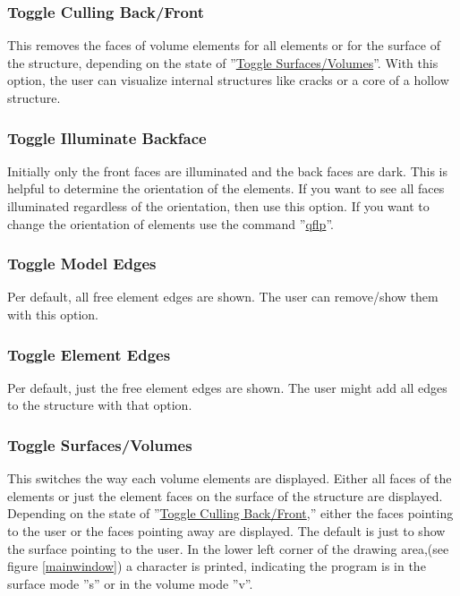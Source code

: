 \documentclass{article}
\providecommand{\htmlref}[2]{\hyperref[#2]{#1}}
\begin{document}
\subsubsection{\label{Toggle Culling Back/Front}Toggle Culling Back/Front}
This removes the faces of volume elements for all elements or for the surface of the structure, depending on the state of ''\htmlref{Toggle Surfaces/Volumes}{Toggle Surfaces/Volumes}''. With this option, the user can visualize internal structures like cracks or a core of a hollow structure.

\subsubsection{\label{Toggle Illuminate Backface}Toggle Illuminate Backface}
Initially only the front faces are illuminated and the back faces are dark. This is helpful to determine the orientation of the elements. If you want to see all faces illuminated regardless of the orientation, then use this option. If you want to change the orientation of elements use the command ''\htmlref{qflp}{qflp}''.

\subsubsection{\label{Toggle Model Edges}Toggle Model Edges}
Per default, all free element edges are shown. The user can remove/show them with this option.

\subsubsection{\label{Toggle Element Edges}Toggle Element Edges}
Per default, just the free element edges are shown. The user might add all edges to the structure with that option.

\subsubsection{\label{Toggle Surfaces/Volumes}Toggle Surfaces/Volumes}
This switches the way each volume elements are displayed. Either all faces of the elements or just the element faces on the surface of the structure are displayed. Depending on the state of ''\htmlref{Toggle Culling Back/Front}{Toggle Culling Back/Front},'' either the faces pointing to the user or the faces pointing away are displayed. The default is just to show the surface pointing to the user. In the lower left corner of the drawing area,(see figure \ref{mainwindow}) a character is printed, indicating the program is in the surface mode ''s'' or in the volume mode ''v''.
\end{document}
